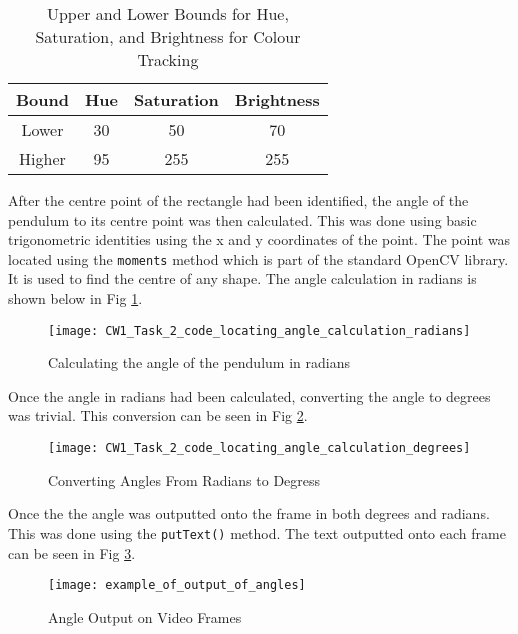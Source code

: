 \documentclass[conference]{IEEEtran}
\begin{document}
\begin{table}
\begin{center}
\caption{Upper and Lower Bounds for Hue, Saturation, and Brightness for Colour Tracking}
\begin{tabular}{ || c || c | c | c || }
\hline
 Bound & Hue & Saturation & Brightness \\ 
\hline
 Lower & 30 & 50 & 70 \\  
\hline
 Higher & 95 & 255 & 255 \\    
\hline

\end{tabular}
\label{table:upper_and_lower_bounds}
\end{center}
\end{table}

After the centre point of the rectangle had been identified, the angle of the pendulum to its centre point was then calculated. This was done using basic trigonometric identities using the x and y coordinates of the point. The point was located using the \verb|moments| method which is part of the standard OpenCV library. It is used to find the centre of any shape. The angle calculation in radians is shown below in Fig \ref{fig:CW1_Task_2_code_locating_angle_calculation_radians}. 

\begin{figure}
\centerline{\texttt{[image: CW1\_Task\_2\_code\_locating\_angle\_calculation\_radians]}}
\caption{Calculating the angle of the pendulum in radians}
\label{fig:CW1_Task_2_code_locating_angle_calculation_radians}
\end{figure}

Once the angle in radians had been calculated, converting the angle to degrees was trivial. This conversion can be seen in Fig \ref{fig:CW1_Task_2_code_locating_angle_calculation_degrees}.

\begin{figure}
\centerline{\texttt{[image: CW1\_Task\_2\_code\_locating\_angle\_calculation\_degrees]}}
\caption{Converting Angles From Radians to Degress}
\label{fig:CW1_Task_2_code_locating_angle_calculation_degrees}
\end{figure}

Once the the angle was outputted onto the frame in both degrees and radians. This was done using the \verb|putText()| method. The text outputted onto each frame can be seen in Fig \ref{fig:example_of_output_of_angles}.

\begin{figure}
\centerline{\texttt{[image: example\_of\_output\_of\_angles]}}
\caption{Angle Output on Video Frames}
\label{fig:example_of_output_of_angles}
\end{figure}
\end{document}
